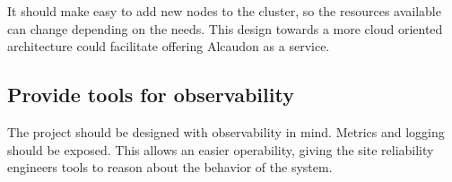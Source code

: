 It should make easy to add new nodes to the cluster, so the resources available
can change depending on the needs. This design towards a more cloud oriented
architecture could facilitate offering Alcaudon as a service.

\subsection{Provide tools for observability}

The project should be designed with observability in mind. Metrics and logging
should be exposed. This allows an easier operability, giving the site
reliability engineers tools to reason about the behavior of the system.
